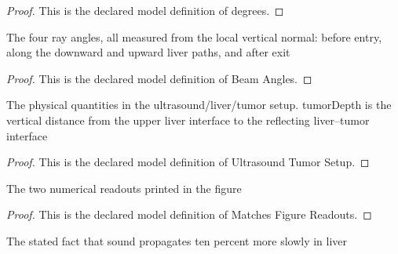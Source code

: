 \begin{proof}
  This is the declared model definition of degrees.
\end{proof}
\begin{definition}
  \label{def:physics:phyx-mini-0004:phyxminiproblems-phyxmini0004-beamangles}
  The four ray angles, all measured from the local vertical normal: before entry, along the downward and upward liver paths, and after exit
\end{definition}
\begin{proof}
  This is the declared model definition of Beam Angles.
\end{proof}
\begin{definition}
  \label{def:physics:phyx-mini-0004:phyxminiproblems-phyxmini0004-ultrasoundtumorsetup}
  The physical quantities in the ultrasound/liver/tumor setup. tumorDepth is the vertical distance from the upper liver interface to the reflecting liver--tumor interface
\end{definition}
\begin{proof}
  This is the declared model definition of Ultrasound Tumor Setup.
\end{proof}
\begin{definition}
  \label{def:physics:phyx-mini-0004:phyxminiproblems-phyxmini0004-matchesfigurereadouts}
  The two numerical readouts printed in the figure
\end{definition}
\begin{proof}
  This is the declared model definition of Matches Figure Readouts.
\end{proof}
\begin{definition}
  \label{def:physics:phyx-mini-0004:phyxminiproblems-phyxmini0004-liverspeedistenpercentlower}
  The stated fact that sound propagates ten percent more slowly in liver
\end{definition}
